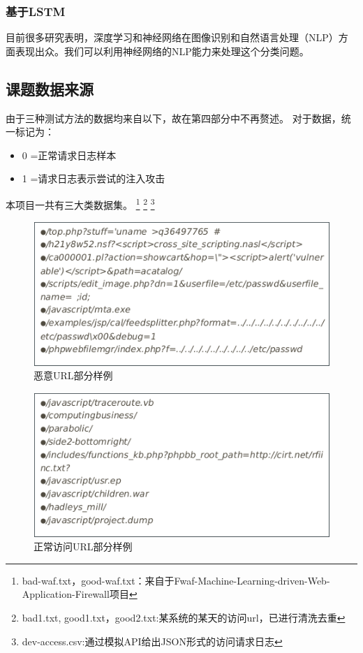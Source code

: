\subsubsection{基于LSTM}
目前很多研究表明，深度学习和神经网络在图像识别和自然语言处理（NLP）方面表现出众。我们可以利用神经网络的NLP能力来处理这个分类问题。
\subsection{课题数据来源}
由于三种测试方法的数据均来自以下，故在第四部分中不再赘述。
对于数据，统一标记为：
\begin{itemize}
    \item 0 =正常请求日志样本
    \item 1 =请求日志表示尝试的注入攻击
\end{itemize}
本项目一共有三大类数据集。\setcounter{footnote}{0}
\footnote{bad-waf.txt，good-waf.txt：来自于Fwaf-Machine-Learning-driven-Web-Application-Firewall项目}
\footnote{bad1.txt, good1.txt，good2.txt:某系统的某天的访问url，已进行清洗去重}
\footnote{dev-access.csv:通过模拟API给出JSON形式的访问请求日志}
\begin{figure}[!h]
    \centering
     \includegraphics[scale=0.4]{Figs/bad.png}
    \caption{恶意URL部分样例}
    \label{fig:bad_sample}
\end{figure}
\begin{figure}[!h]
    \centering
     \includegraphics[scale=0.4]{Figs/good.png}
    \caption{正常访问URL部分样例}
    \label{fig:good_sample}
\end{figure}
